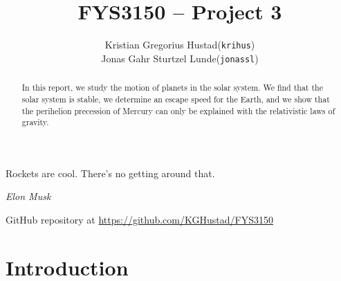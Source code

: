 \documentclass[a4paper]{article}
\begin{document}
\title{FYS3150 -- Project 3}
\author{
    \begin{tabular}{r l}
        Kristian Gregorius Hustad & (\texttt{krihus})\\
        Jonas Gahr Sturtzel Lunde & (\texttt{jonassl})
    \end{tabular}}

\maketitle




\setlength{\epigraphwidth}{0.75\textwidth}
\renewcommand{\epigraphflush}{center}
\renewcommand{\beforeepigraphskip}{50pt}
\renewcommand{\afterepigraphskip}{100pt}
\renewcommand{\epigraphsize}{\normalsize}

\epigraph{Rockets are cool. There's no getting around that.}
{\textit{Elon Musk}}


\begin{abstract}
\noindent
In this report, we study the motion of planets in the solar system. We find that the solar system is stable, we determine an escape speed for the Earth, and we show that the perihelion precession of Mercury can only be explained with the relativistic laws of gravity.
\end{abstract}

\vfill


\begin{center}
    GitHub repository at \url{https://github.com/KGHustad/FYS3150}
\end{center}

\newpage

\newcommand{\half}{\frac{1}{2}}
\newcommand{\dt}{{\Delta t}}
\newcommand{\dx}{{\Delta x}}
\newcommand{\bigO}{{\mathcal{O}}}

\newcommand{\supnew}{^{\mathrm{new}}}



\section{Introduction}\label{sec:intro}
\end{document}
